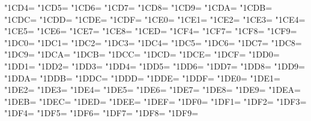 \XeTeXcharclass"1CD4=\KclassCM
\XeTeXcharclass"1CD5=\KclassCM
\XeTeXcharclass"1CD6=\KclassCM
\XeTeXcharclass"1CD7=\KclassCM
\XeTeXcharclass"1CD8=\KclassCM
\XeTeXcharclass"1CD9=\KclassCM
\XeTeXcharclass"1CDA=\KclassCM
\XeTeXcharclass"1CDB=\KclassCM
\XeTeXcharclass"1CDC=\KclassCM
\XeTeXcharclass"1CDD=\KclassCM
\XeTeXcharclass"1CDE=\KclassCM
\XeTeXcharclass"1CDF=\KclassCM
\XeTeXcharclass"1CE0=\KclassCM
\XeTeXcharclass"1CE1=\KclassCM
\XeTeXcharclass"1CE2=\KclassCM
\XeTeXcharclass"1CE3=\KclassCM
\XeTeXcharclass"1CE4=\KclassCM
\XeTeXcharclass"1CE5=\KclassCM
\XeTeXcharclass"1CE6=\KclassCM
\XeTeXcharclass"1CE7=\KclassCM
\XeTeXcharclass"1CE8=\KclassCM
\XeTeXcharclass"1CED=\KclassCM
\XeTeXcharclass"1CF4=\KclassCM
\XeTeXcharclass"1CF7=\KclassCM
\XeTeXcharclass"1CF8=\KclassCM
\XeTeXcharclass"1CF9=\KclassCM
\XeTeXcharclass"1DC0=\KclassCM
\XeTeXcharclass"1DC1=\KclassCM
\XeTeXcharclass"1DC2=\KclassCM
\XeTeXcharclass"1DC3=\KclassCM
\XeTeXcharclass"1DC4=\KclassCM
\XeTeXcharclass"1DC5=\KclassCM
\XeTeXcharclass"1DC6=\KclassCM
\XeTeXcharclass"1DC7=\KclassCM
\XeTeXcharclass"1DC8=\KclassCM
\XeTeXcharclass"1DC9=\KclassCM
\XeTeXcharclass"1DCA=\KclassCM
\XeTeXcharclass"1DCB=\KclassCM
\XeTeXcharclass"1DCC=\KclassCM
\XeTeXcharclass"1DCD=\KclassCM
\XeTeXcharclass"1DCE=\KclassCM
\XeTeXcharclass"1DCF=\KclassCM
\XeTeXcharclass"1DD0=\KclassCM
\XeTeXcharclass"1DD1=\KclassCM
\XeTeXcharclass"1DD2=\KclassCM
\XeTeXcharclass"1DD3=\KclassCM
\XeTeXcharclass"1DD4=\KclassCM
\XeTeXcharclass"1DD5=\KclassCM
\XeTeXcharclass"1DD6=\KclassCM
\XeTeXcharclass"1DD7=\KclassCM
\XeTeXcharclass"1DD8=\KclassCM
\XeTeXcharclass"1DD9=\KclassCM
\XeTeXcharclass"1DDA=\KclassCM
\XeTeXcharclass"1DDB=\KclassCM
\XeTeXcharclass"1DDC=\KclassCM
\XeTeXcharclass"1DDD=\KclassCM
\XeTeXcharclass"1DDE=\KclassCM
\XeTeXcharclass"1DDF=\KclassCM
\XeTeXcharclass"1DE0=\KclassCM
\XeTeXcharclass"1DE1=\KclassCM
\XeTeXcharclass"1DE2=\KclassCM
\XeTeXcharclass"1DE3=\KclassCM
\XeTeXcharclass"1DE4=\KclassCM
\XeTeXcharclass"1DE5=\KclassCM
\XeTeXcharclass"1DE6=\KclassCM
\XeTeXcharclass"1DE7=\KclassCM
\XeTeXcharclass"1DE8=\KclassCM
\XeTeXcharclass"1DE9=\KclassCM
\XeTeXcharclass"1DEA=\KclassCM
\XeTeXcharclass"1DEB=\KclassCM
\XeTeXcharclass"1DEC=\KclassCM
\XeTeXcharclass"1DED=\KclassCM
\XeTeXcharclass"1DEE=\KclassCM
\XeTeXcharclass"1DEF=\KclassCM
\XeTeXcharclass"1DF0=\KclassCM
\XeTeXcharclass"1DF1=\KclassCM
\XeTeXcharclass"1DF2=\KclassCM
\XeTeXcharclass"1DF3=\KclassCM
\XeTeXcharclass"1DF4=\KclassCM
\XeTeXcharclass"1DF5=\KclassCM
\XeTeXcharclass"1DF6=\KclassCM
\XeTeXcharclass"1DF7=\KclassCM
\XeTeXcharclass"1DF8=\KclassCM
\XeTeXcharclass"1DF9=\KclassCM

